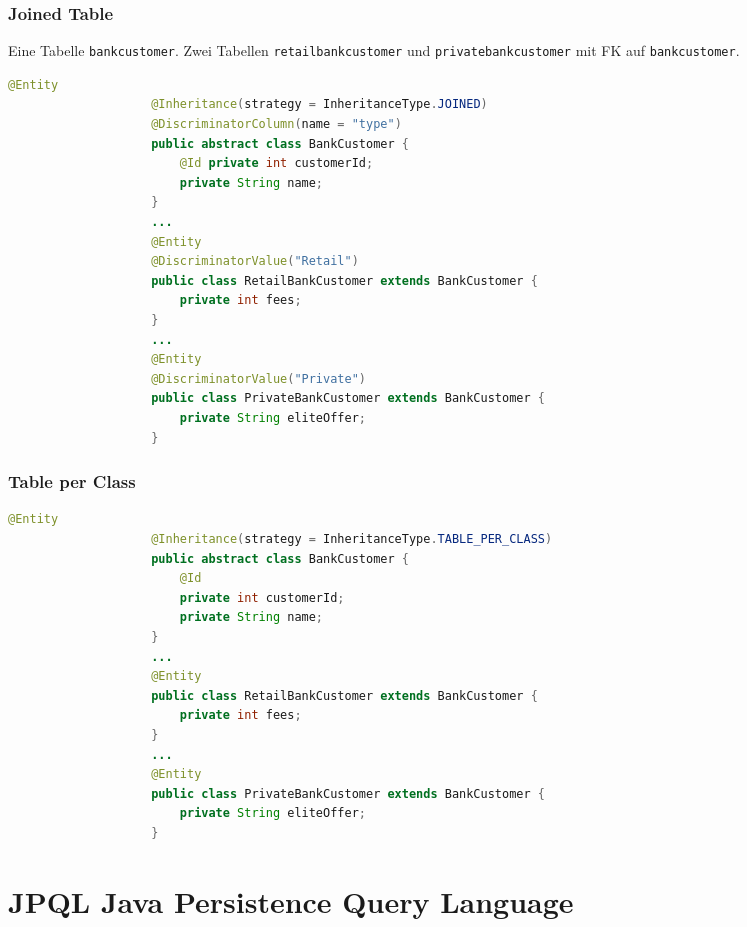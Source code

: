 \documentclass[a4paper, landscape, 8pt]{scrartcl}
\begin{document}
\begin{multicols*}{4}
        \subsubsection{Joined Table}
        Eine Tabelle \texttt{bankcustomer}.
        Zwei Tabellen \texttt{retailbankcustomer} und \texttt{privatebankcustomer} mit FK auf \texttt{bankcustomer}.
        \begin{lstlisting}[language=java]
                    @Entity
                    @Inheritance(strategy = InheritanceType.JOINED)
                    @DiscriminatorColumn(name = "type")
                    public abstract class BankCustomer {
                        @Id private int customerId;
                        private String name;
                    }
                    ...
                    @Entity
                    @DiscriminatorValue("Retail")
                    public class RetailBankCustomer extends BankCustomer {
                        private int fees;
                    }
                    ...
                    @Entity
                    @DiscriminatorValue("Private")
                    public class PrivateBankCustomer extends BankCustomer {
                        private String eliteOffer;
                    }
        \end{lstlisting}
        
        \subsubsection{Table per Class}
        \begin{lstlisting}[language=java]
                    @Entity
                    @Inheritance(strategy = InheritanceType.TABLE_PER_CLASS)
                    public abstract class BankCustomer {
                        @Id
                        private int customerId;
                        private String name;
                    }
                    ...
                    @Entity
                    public class RetailBankCustomer extends BankCustomer {
                        private int fees;
                    }
                    ...
                    @Entity
                    public class PrivateBankCustomer extends BankCustomer {
                        private String eliteOffer;
                    }
        \end{lstlisting}

        \section{JPQL \tiny{Java Persistence Query Language}}

\end{multicols*}
\end{document}
